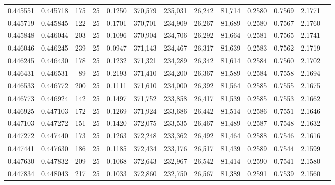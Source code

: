 \begin{tabular}{rrrrrrrrrrrrr}
0.445551 & 0.445718 &   175 &  25 &                                     0.1250 & 370,579 & 235,031 &  26,242 &  81,714 & 0.2580 & 0.7569 & 2.1771 \\
0.445719 & 0.445845 &   122 &  25 &                                     0.1701 & 370,701 & 234,909 &  26,267 &  81,689 & 0.2580 & 0.7567 & 2.1760 \\
0.445848 & 0.446044 &   203 &  25 &                                     0.1096 & 370,904 & 234,706 &  26,292 &  81,664 & 0.2581 & 0.7565 & 2.1741 \\
0.446046 & 0.446245 &   239 &  25 &                                     0.0947 & 371,143 & 234,467 &  26,317 &  81,639 & 0.2583 & 0.7562 & 2.1719 \\
0.446245 & 0.446430 &   178 &  25 &                                     0.1232 & 371,321 & 234,289 &  26,342 &  81,614 & 0.2584 & 0.7560 & 2.1702 \\
0.446431 & 0.446531 &    89 &  25 &                                     0.2193 & 371,410 & 234,200 &  26,367 &  81,589 & 0.2584 & 0.7558 & 2.1694 \\
0.446533 & 0.446772 &   200 &  25 &                                     0.1111 & 371,610 & 234,000 &  26,392 &  81,564 & 0.2585 & 0.7555 & 2.1675 \\
0.446773 & 0.446924 &   142 &  25 &                                     0.1497 & 371,752 & 233,858 &  26,417 &  81,539 & 0.2585 & 0.7553 & 2.1662 \\
0.446925 & 0.447103 &   172 &  25 &                                     0.1269 & 371,924 & 233,686 &  26,442 &  81,514 & 0.2586 & 0.7551 & 2.1646 \\
0.447103 & 0.447272 &   151 &  25 &                                     0.1420 & 372,075 & 233,535 &  26,467 &  81,489 & 0.2587 & 0.7548 & 2.1632 \\
0.447272 & 0.447440 &   173 &  25 &                                     0.1263 & 372,248 & 233,362 &  26,492 &  81,464 & 0.2588 & 0.7546 & 2.1616 \\
0.447441 & 0.447630 &   186 &  25 &                                     0.1185 & 372,434 & 233,176 &  26,517 &  81,439 & 0.2589 & 0.7544 & 2.1599 \\
0.447630 & 0.447832 &   209 &  25 &                                     0.1068 & 372,643 & 232,967 &  26,542 &  81,414 & 0.2590 & 0.7541 & 2.1580 \\
0.447834 & 0.448043 &   217 &  25 &                                     0.1033 & 372,860 & 232,750 &  26,567 &  81,389 & 0.2591 & 0.7539 & 2.1560 \\

\end{tabular}
